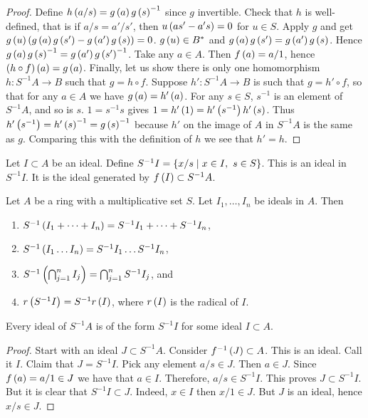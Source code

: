 \begin{proof}
Define $ h\left( a / s \right) = g\left( a \right)g\left( s \right)^{-1} $ since $ g $ invertible. Check that $ h $ is well-defined, that is if $ a / s = a' / s' $, then $ u\left( as' - a's \right) = 0 $ for $ u \in S $. Apply $ g $ and get $ g\left( u \right)\left( g\left( a \right)g\left( s' \right) - g\left( a' \right)g\left( s \right) \right) = 0 $. $ g\left( u \right) \in B^* $ and $ g\left( a \right)g\left( s' \right) = g\left( a' \right)g\left( s \right) $. Hence $ g\left( a \right)g\left( s \right)^{-1} = g\left( a' \right)g\left( s' \right)^{-1} $. Take any $ a \in A $. Then $ f\left( a \right) = a / 1 $, hence $ \left( h \circ f \right)\left( a \right) = g\left( a \right) $. Finally, let us show there is only one homomorphism $ h : S^{-1}A \to B $ such that $ g = h \circ f $. Suppose $ h' : S^{-1}A \to B $ is such that $ g = h' \circ f $, so that for any $ a \in A $ we have $ g\left( a \right) = h'\left( a \right) $. For any $ s \in S $, $ s^{-1} $ is an element of $ S^{-1}A $, and so is $ s $. $ 1 = s^{-1}s $ gives $ 1 = h'\left( 1 \right) = h'\left( s^{-1} \right)h'\left( s \right) $. Thus $ h'\left( s^{-1} \right) = h'\left( s \right)^{-1} = g\left( s \right)^{-1} $ because $ h' $ on the image of $ A $ in $ S^{-1}A $ is the same as $ g $. Comparing this with the definition of $ h $ we see that $ h' = h $.
\end{proof}

Let $ I \subset A $ be an ideal. Define $ S^{-1}I = \left\{ x / s \mid x \in I, \ s \in S \right\} $. This is an ideal in $ S^{-1}I $. It is the ideal generated by $ f\left( I \right) \subset S^{-1}A $.

\begin{proposition}
Let $ A $ be a ring with a multiplicative set $ S $. Let $ I_1, \dots, I_n $ be ideals in $ A $. Then
\begin{enumerate}
\item $ S^{-1}\left( I_1 + \dots + I_n \right) = S^{-1}I_1 + \dots + S^{-1}I_n $,
\item $ S^{-1}\left( I_1 \dots I_n \right) = S^{-1}I_1 \dots S^{-1}I_n $,
\item $ S^{-1}\left( \bigcap_{j = 1}^n I_j \right) = \bigcap_{j = 1}^n S^{-1}I_j $, and
\item $ r\left( S^{-1}I \right) = S^{-1}r\left( I \right) $, where $ r\left( I \right) $ is the radical of $ I $.
\end{enumerate}
\end{proposition}

\begin{proposition}
\label{prop:6.8}
Every ideal of $ S^{-1}A $ is of the form $ S^{-1}I $ for some ideal $ I \subset A $.
\end{proposition}

\begin{proof}
Start with an ideal $ J \subset S^{-1}A $. Consider $ f^{-1}\left( J \right) \subset A $. This is an ideal. Call it $ I $. Claim that $ J = S^{-1}I $. Pick any element $ a / s \in J $. Then $ a \in J $. Since $ f\left( a \right) = a / 1 \in J $ we have that $ a \in I $. Therefore, $ a / s \in S^{-1}I $. This proves $ J \subset S^{-1}I $. But it is clear that $ S^{-1}I \subset J $. Indeed, $ x \in I $ then $ x / 1 \in J $. But $ J $ is an ideal, hence $ x / s \in J $.
\end{proof}

